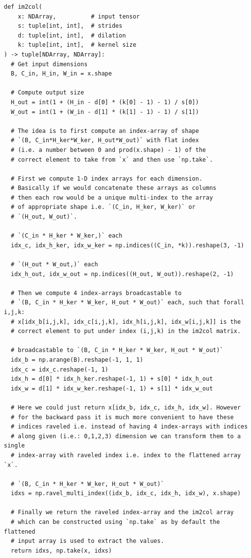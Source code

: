 \documentclass{myclass}
\begin{document}
\begin{minipage}{\linewidth}
\begin{lstlisting}[caption=Im2Col Operation]
def im2col(
    x: NDArray,          # input tensor
    s: tuple[int, int],  # strides
    d: tuple[int, int],  # dilation
    k: tuple[int, int],  # kernel size
) -> tuple[NDArray, NDArray]:
  # Get input dimensions
  B, C_in, H_in, W_in = x.shape

  # Compute output size
  H_out = int(1 + (H_in - d[0] * (k[0] - 1) - 1) / s[0])
  W_out = int(1 + (W_in - d[1] * (k[1] - 1) - 1) / s[1])
  
  # The idea is to first compute an index-array of shape 
  # `(B, C_in*H_ker*W_ker, H_out*W_out)` with flat index 
  # (i.e. a number between 0 and prod(x.shape) - 1) of the 
  # correct element to take from `x` and then use `np.take`.

  # First we compute 1-D index arrays for each dimension.
  # Basically if we would concatenate these arrays as columns
  # then each row would be a unique multi-index to the array
  # of appropriate shape i.e. `(C_in, H_ker, W_ker)` or 
  # `(H_out, W_out)`.

  # `(C_in * H_ker * W_ker,)` each
  idx_c, idx_h_ker, idx_w_ker = np.indices((C_in, *k)).reshape(3, -1)

  # `(H_out * W_out,)` each
  idx_h_out, idx_w_out = np.indices((H_out, W_out)).reshape(2, -1)

  # Then we compute 4 index-arrays broadcastable to 
  # `(B, C_in * H_ker * W_ker, H_out * W_out)` each, such that forall i,j,k: 
  # x[idx_b[i,j,k], idx_c[i,j,k], idx_h[i,j,k], idx_w[i,j,k]] is the 
  # correct element to put under index (i,j,k) in the im2col matrix.

  # broadcastable to `(B, C_in * H_ker * W_ker, H_out * W_out)`
  idx_b = np.arange(B).reshape(-1, 1, 1)
  idx_c = idx_c.reshape(-1, 1)
  idx_h = d[0] * idx_h_ker.reshape(-1, 1) + s[0] * idx_h_out
  idx_w = d[1] * idx_w_ker.reshape(-1, 1) + s[1] * idx_w_out

  # Here we could just return x[idx_b, idx_c, idx_h, idx_w]. However
  # for the backward pass it is much more convenient to have these
  # indices raveled i.e. instead of having 4 index-arrays with indices 
  # along given (i.e.: 0,1,2,3) dimension we can transform them to a single 
  # index-array with raveled index i.e. index to the flattened array `x`.

  # `(B, C_in * H_ker * W_ker, H_out * W_out)`
  idxs = np.ravel_multi_index((idx_b, idx_c, idx_h, idx_w), x.shape)

  # Finally we return the raveled index-array and the im2col array
  # which can be constructed using `np.take` as by default the flattened
  # input array is used to extract the values.
  return idxs, np.take(x, idxs)
\end{lstlisting} 
\end{minipage}
\end{document}

